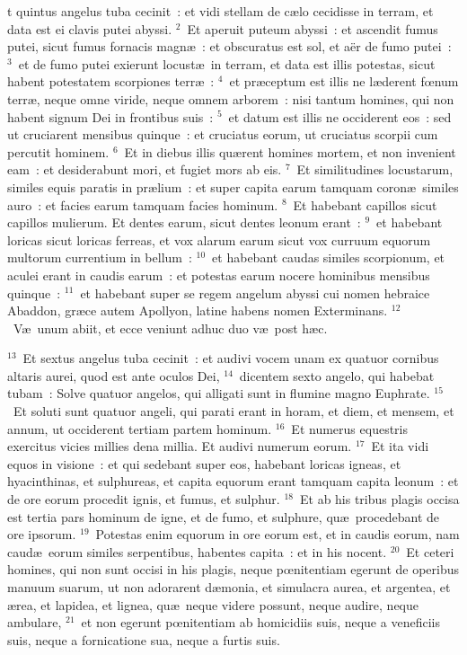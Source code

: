 \bchapter
{}t quintus angelus tuba cecinit~: et vidi stellam de c\ae lo cecidisse in terram, et data est ei clavis putei abyssi.
${}^{2}$~Et aperuit puteum abyssi~: et ascendit fumus putei, sicut fumus fornacis magn\ae~: et obscuratus est sol, et a\"er de fumo putei~:
${}^{3}$~et de fumo putei exierunt locust\ae\ in terram, et data est illis potestas, sicut habent potestatem scorpiones terr\ae~:
${}^{4}$~et pr\ae ceptum est illis ne l\ae derent fœnum terr\ae , neque omne viride, neque omnem arborem~: nisi tantum homines, qui non habent signum Dei in frontibus suis~:
${}^{5}$~et datum est illis ne occiderent eos~: sed ut cruciarent mensibus quinque~: et cruciatus eorum, ut cruciatus scorpii cum percutit hominem.
${}^{6}$~Et in diebus illis qu\ae rent homines mortem, et non invenient eam~: et desiderabunt mori, et fugiet mors ab eis.
${}^{7}$~Et similitudines locustarum, similes equis paratis in pr\ae lium~: et super capita earum tamquam coron\ae\ similes auro~: et facies earum tamquam facies hominum.
${}^{8}$~Et habebant capillos sicut capillos mulierum. Et dentes earum, sicut dentes leonum erant~:
${}^{9}$~et habebant loricas sicut loricas ferreas, et vox alarum earum sicut vox curruum equorum multorum currentium in bellum~:
${}^{10}$~et habebant caudas similes scorpionum, et aculei erant in caudis earum~: et potestas earum nocere hominibus mensibus quinque~:
${}^{11}$~et habebant super se regem angelum abyssi cui nomen hebraice Abaddon, gr\ae ce autem Apollyon, latine habens nomen Exterminans.
${}^{12}$~V\ae\ unum abiit, et ecce veniunt adhuc duo v\ae\ post h\ae c.


${}^{13}$~Et sextus angelus tuba cecinit~: et audivi vocem unam ex quatuor cornibus altaris aurei, quod est ante oculos Dei,
${}^{14}$~dicentem sexto angelo, qui habebat tubam~: Solve quatuor angelos, qui alligati sunt in flumine magno Euphrate.
${}^{15}$~Et soluti sunt quatuor angeli, qui parati erant in horam, et diem, et mensem, et annum, ut occiderent tertiam partem hominum.
${}^{16}$~Et numerus equestris exercitus vicies millies dena millia. Et audivi numerum eorum.
${}^{17}$~Et ita vidi equos in visione~: et qui sedebant super eos, habebant loricas igneas, et hyacinthinas, et sulphureas, et capita equorum erant tamquam capita leonum~: et de ore eorum procedit ignis, et fumus, et sulphur.
${}^{18}$~Et ab his tribus plagis occisa est tertia pars hominum de igne, et de fumo, et sulphure, qu\ae\ procedebant de ore ipsorum.
${}^{19}$~Potestas enim equorum in ore eorum est, et in caudis eorum, nam caud\ae\ eorum similes serpentibus, habentes capita~: et in his nocent.
${}^{20}$~Et ceteri homines, qui non sunt occisi in his plagis, neque pœnitentiam egerunt de operibus manuum suarum, ut non adorarent d\ae monia, et simulacra aurea, et argentea, et \ae rea, et lapidea, et lignea, qu\ae\ neque videre possunt, neque audire, neque ambulare,
${}^{21}$~et non egerunt pœnitentiam ab homicidiis suis, neque a veneficiis suis, neque a fornicatione sua, neque a furtis suis.

